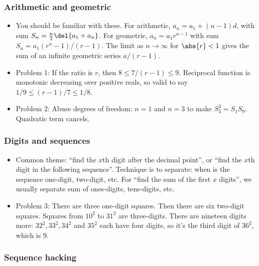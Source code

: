 \documentclass[10pt,paper=letter]{scrartcl}
\begin{document}
\subsubsection*{Arithmetic and geometric}

\begin{itemize}
  \item You should be familiar with these. For arithmetic, $a_n = a_1 + (n-1)d$, with sum $S_n = \frac{n}{2}\del{a_1 + a_n}$. For geometric, $a_n = a_1r^{n-1}$ with sum $S_n = a_1(r^n-1)/(r-1)$. The limit as $n \to \infty$ for $\abs{r} < 1$ gives the sum of an infinite geometric series $a/(r-1)$.
  \item Problem 1: If the ratio is $r$, then $8 \leq 7/(r-1) \leq 9$. Reciprocal function is monotonic decreasing over positive reals, so valid to say $1/9 \leq (r-1)/7 \leq 1/8$. 
  \item Problem 2: Abuse degrees of freedom: $n = 1$ and $n = 3$ to make $S_3^2 = S_1S_9$. Quadratic term cancels.
\end{itemize}

\subsubsection*{Digits and sequences}

\begin{itemize}
  \item Common theme: ``find the $x$th digit after the decimal point'', or ``find the $x$th digit in the following sequence''. Technique is to separate: when is the sequence one-digit, two-digit, etc. For ``find the sum of the first $x$ digits'', we usually separate sum of ones-digits, tens-digits, etc.
  \item Problem 3: There are three one-digit squares. Then there are six two-digit squares. Squares from $10^2$ to $31^2$ are three-digits. There are nineteen digits more: $32^2, 33^2, 34^2$ and $35^2$ each have four digits, so it's the third digit of $36^2$, which is $9$.
\end{itemize}

\newpage

\subsubsection*{Sequence hacking}
\end{document}
